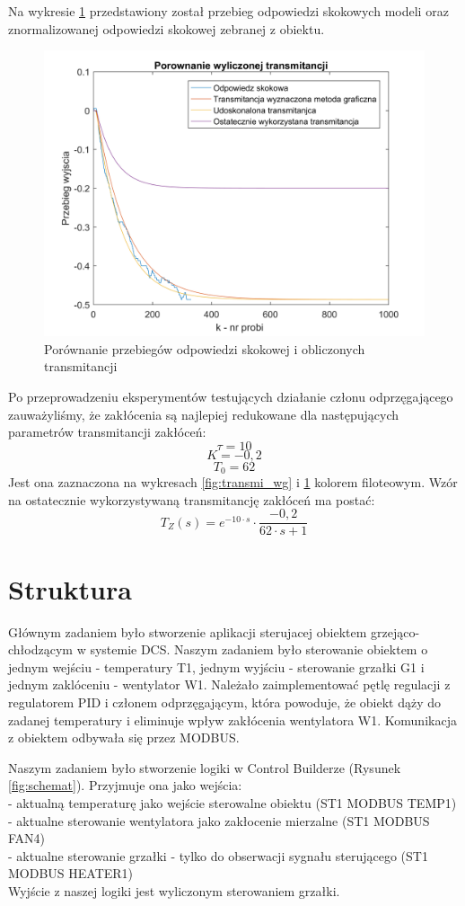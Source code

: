 \documentclass[12pt, a4paper]{article}
\begin{document}
Na wykresie \ref{fig:transmi_wdlep} przedstawiony został przebieg odpowiedzi skokowych modeli oraz znormalizowanej odpowiedzi skokowej zebranej z obiektu.
\begin{figure}[H]
	\centering
	\includegraphics[width=0.9\linewidth]{transmi_wdlep}
	\caption  {Porównanie przebiegów odpowiedzi skokowej i obliczonych transmitancji}
	\label{fig:transmi_wdlep}
\end{figure}
Po przeprowadzeniu eksperymentów testujących działanie członu odprzęgającego zauważyliśmy, że zakłócenia są najlepiej redukowane dla następujących parametrów transmitancji zakłóceń:
\[\tau=10\]
\[K=-0,2\]
\[T_{0}=62\]
Jest ona zaznaczona na wykresach \ref{fig:transmi_wg} i \ref{fig:transmi_wdlep} kolorem filoteowym.
Wzór na ostatecznie wykorzystywaną transmitancję zakłóceń ma postać:
\[T_{Z}(s)=e^{-10 \cdot s} \cdot \frac{-0,2}{62 \cdot s +1}\]


\section{Struktura}
Głównym zadaniem było stworzenie aplikacji sterujacej obiektem grzejąco-chłodzącym w systemie DCS. Naszym zadaniem było sterowanie obiektem o jednym wejściu - temperatury T1, jednym wyjściu - sterowanie grzałki G1 i jednym zaklóceniu - wentylator W1. Należało zaimplementować pętlę regulacji z regulatorem PID i członem odprzęgającym, która powoduje, że obiekt dąży do zadanej temperatury i eliminuje wpływ zakłócenia wentylatora W1. Komunikacja z obiektem odbywała się przez MODBUS. 

Naszym zadaniem było stworzenie logiki w Control Builderze (Rysunek \ref{fig:schemat}). Przyjmuje ona jako wejścia:\\
- aktualną temperaturę jako wejście sterowalne obiektu (ST1 MODBUS TEMP1)\\
- aktualne sterowanie wentylatora jako zakłocenie mierzalne (ST1 MODBUS FAN4)\\
- aktualne sterowanie grzałki - tylko do obserwacji sygnału sterującego (ST1 MODBUS HEATER1)\\
Wyjście z naszej logiki jest wyliczonym sterowaniem grzałki. \\
\end{document}
